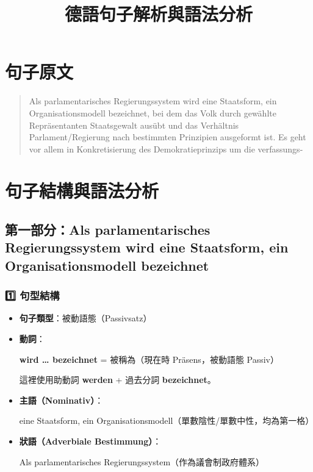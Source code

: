\documentclass{article}
\begin{document}
\title{德語句子解析與語法分析}
\author{}
\date{}
\maketitle

\section{句子原文}

\begin{quote}
Als parlamentarisches Regierungssystem wird eine Staatsform, ein Organisationsmodell bezeichnet, bei dem das Volk durch gewählte Repräsentanten Staatsgewalt ausübt und das Verhältnis Parlament/Regierung nach bestimmten Prinzipien ausgeformt ist. Es geht vor allem in Konkretisierung des Demokratieprinzips um die verfassungs-
\end{quote}

\section{句子結構與語法分析}

\subsection{第一部分：Als parlamentarisches Regierungssystem wird eine Staatsform, ein Organisationsmodell bezeichnet}

\subsubsection{1️⃣ 句型結構}
\begin{itemize}
    \item \textbf{句子類型}：被動語態（Passivsatz）
    \item \textbf{動詞}：
    \begin{tcolorbox}[colframe=blue!50, colback=blue!5, sharp corners]
        \textbf{wird … bezeichnet} = 被稱為（現在時 Pr\"asens，被動語態 Passiv）
    \end{tcolorbox}
    這裡使用助動詞 \textbf{werden} + 過去分詞 \textbf{bezeichnet}。
    \item \textbf{主語（Nominativ）}：
    \begin{tcolorbox}[colframe=red!50, colback=red!5, sharp corners]
        eine Staatsform, ein Organisationsmodell（單數陰性/單數中性，均為第一格）
    \end{tcolorbox}
    \item \textbf{狀語（Adverbiale Bestimmung）}：
    \begin{tcolorbox}[colframe=green!50, colback=green!5, sharp corners]
        Als parlamentarisches Regierungssystem（作為議會制政府體系）
    \end{tcolorbox}
\end{itemize}
\end{document}
